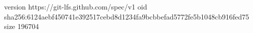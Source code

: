 version https://git-lfs.github.com/spec/v1
oid sha256:6124aebf450741e392517cebd8d1234fa9bcbbefad5772fe5b1048cb916fed75
size 196704
